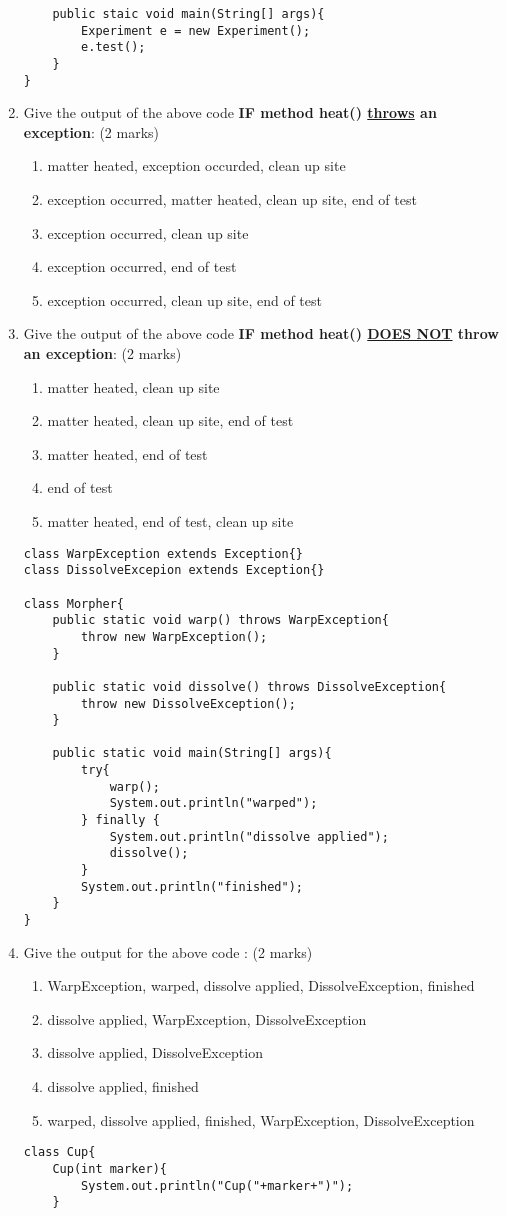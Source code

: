 \documentclass{article}
\begin{document}
\begin{enumerate}[resume]
\begin{lstlisting}
	public staic void main(String[] args){
		Experiment e = new Experiment();
		e.test();
	}
}
	\end{lstlisting}
	\item Give the output of the above code \textbf{IF method heat() \underline{throws} an exception}: (2 marks)
	\begin{enumerate}
		\item matter heated, exception occurded, clean up site
		\item exception occurred, matter heated, clean up site, end of test
		\item exception occurred, clean up site
		\item exception occurred, end of test
		\item exception occurred, clean up site, end of test
	\end{enumerate}
	\item Give the output of the above code \textbf{IF method heat() \underline{DOES NOT} throw an exception}: (2 marks)
	\begin{enumerate}
		\item matter heated, clean up site
		\item matter heated, clean up site, end of test
		\item matter heated, end of test
		\item end of test
		\item matter heated, end of test, clean up site
	\end{enumerate}
	\newpage
	\begin{lstlisting}
class WarpException extends Exception{}
class DissolveExcepion extends Exception{}

class Morpher{
	public static void warp() throws WarpException{
		throw new WarpException();
	}
	
	public static void dissolve() throws DissolveException{
		throw new DissolveException();
	}
	
	public static void main(String[] args){
		try{
			warp();
			System.out.println("warped");
		} finally {
			System.out.println("dissolve applied");
			dissolve();
		}
		System.out.println("finished");
	}
}
	\end{lstlisting}
	\item Give the output for the above code : (2 marks)
	\begin{enumerate}
		\item WarpException, warped, dissolve applied, DissolveException, finished
		\item dissolve applied, WarpException, DissolveException
		\item dissolve applied, DissolveException
		\item dissolve applied, finished
		\item warped, dissolve applied, finished, WarpException, DissolveException
	\end{enumerate}
	\newpage
	\begin{lstlisting} 
class Cup{
	Cup(int marker){
		System.out.println("Cup("+marker+")");
	}
	

\end{lstlisting}
\end{enumerate}
\end{document}
